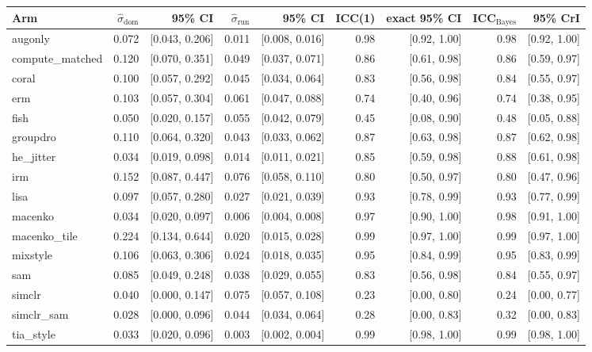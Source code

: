 \begin{tabular}{lrrrrrrrr}
\toprule
Arm & $\hat\sigma_\text{dom}$ & 95\% CI & $\hat\sigma_\text{run}$ & 95\% CI & ICC(1) & exact 95\% CI & ICC$_\text{Bayes}$ & 95\% CrI \\
\midrule
augonly & 0.072 & [0.043, 0.206] & 0.011 & [0.008, 0.016] & 0.98 & [0.92, 1.00] & 0.98 & [0.92, 1.00] \\
compute\_matched & 0.120 & [0.070, 0.351] & 0.049 & [0.037, 0.071] & 0.86 & [0.61, 0.98] & 0.86 & [0.59, 0.97] \\
coral & 0.100 & [0.057, 0.292] & 0.045 & [0.034, 0.064] & 0.83 & [0.56, 0.98] & 0.84 & [0.55, 0.97] \\
erm & 0.103 & [0.057, 0.304] & 0.061 & [0.047, 0.088] & 0.74 & [0.40, 0.96] & 0.74 & [0.38, 0.95] \\
fish & 0.050 & [0.020, 0.157] & 0.055 & [0.042, 0.079] & 0.45 & [0.08, 0.90] & 0.48 & [0.05, 0.88] \\
groupdro & 0.110 & [0.064, 0.320] & 0.043 & [0.033, 0.062] & 0.87 & [0.63, 0.98] & 0.87 & [0.62, 0.98] \\
he\_jitter & 0.034 & [0.019, 0.098] & 0.014 & [0.011, 0.021] & 0.85 & [0.59, 0.98] & 0.88 & [0.61, 0.98] \\
irm & 0.152 & [0.087, 0.447] & 0.076 & [0.058, 0.110] & 0.80 & [0.50, 0.97] & 0.80 & [0.47, 0.96] \\
lisa & 0.097 & [0.057, 0.280] & 0.027 & [0.021, 0.039] & 0.93 & [0.78, 0.99] & 0.93 & [0.77, 0.99] \\
macenko & 0.034 & [0.020, 0.097] & 0.006 & [0.004, 0.008] & 0.97 & [0.90, 1.00] & 0.98 & [0.91, 1.00] \\
macenko\_tile & 0.224 & [0.134, 0.644] & 0.020 & [0.015, 0.028] & 0.99 & [0.97, 1.00] & 0.99 & [0.97, 1.00] \\
mixstyle & 0.106 & [0.063, 0.306] & 0.024 & [0.018, 0.035] & 0.95 & [0.84, 0.99] & 0.95 & [0.83, 0.99] \\
sam & 0.085 & [0.049, 0.248] & 0.038 & [0.029, 0.055] & 0.83 & [0.56, 0.98] & 0.84 & [0.55, 0.97] \\
simclr & 0.040 & [0.000, 0.147] & 0.075 & [0.057, 0.108] & 0.23 & [0.00, 0.80] & 0.24 & [0.00, 0.77] \\
simclr\_sam & 0.028 & [0.000, 0.096] & 0.044 & [0.034, 0.064] & 0.28 & [0.00, 0.83] & 0.32 & [0.00, 0.83] \\
tia\_style & 0.033 & [0.020, 0.096] & 0.003 & [0.002, 0.004] & 0.99 & [0.98, 1.00] & 0.99 & [0.98, 1.00] \\
\bottomrule
\end{tabular}
